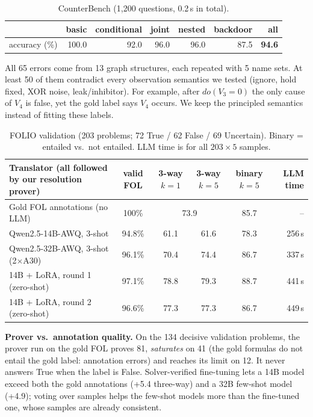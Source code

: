 \documentclass[10pt,a4paper]{article}
\newcommand{\RtwoKone}{77.3}\newcommand{\RtwoKfive}{77.3}\newcommand{\RtwoKfiveB}{86.7}
\newcommand{\RtwoValid}{96.6\%}\newcommand{\RtwoN}{2{,}703}
\begin{document}
\begin{table}[H]
\centering\small
\caption{CounterBench (1{,}200 questions, 0.2\,s in total).}
\label{tab:cb}
\begin{tabular}{@{}lrrrrrr@{}}
\toprule
 & basic & conditional & joint & nested & backdoor & \textbf{all} \\
\midrule
accuracy (\%) & 100.0 & 92.0 & 96.0 & 96.0 & 87.5 & \textbf{94.6} \\
\bottomrule
\end{tabular}
\end{table}
\noindent All 65 errors come from 13 graph structures, each repeated with 5 name sets. At least 50 of them contradict every observation semantics we tested (ignore, hold fixed, XOR noise, leak/inhibitor). For example, after $do(V_3{=}0)$ the only cause of $V_4$ is false, yet the gold label says $V_4$ occurs. We keep the principled semantics instead of fitting these labels.

\begin{table}[H]
\centering\small
\caption{FOLIO validation (203 problems; 72 True / 62 False / 69 Uncertain). Binary = entailed vs.\ not entailed. LLM time is for all $203\times5$ samples.}
\label{tab:folio}
\begin{tabular}{@{}lccccr@{}}
\toprule
Translator (all followed by our resolution prover) & valid FOL & 3-way $k{=}1$ & 3-way $k{=}5$ & binary $k{=}5$ & LLM time \\
\midrule
Gold FOL annotations (no LLM) & 100\% & \multicolumn{2}{c}{73.9} & 85.7 & -- \\
Qwen2.5-14B-AWQ, 3-shot & 94.8\% & 61.1 & 61.6 & 78.3 & 256\,s \\
Qwen2.5-32B-AWQ, 3-shot (2$\times$A30) & 96.1\% & 70.4 & 74.4 & 86.7 & 337\,s \\
14B + LoRA, round 1 (zero-shot) & 97.1\% & 78.8 & 79.3 & 88.7 & 441\,s \\
14B + LoRA, round 2 (zero-shot) & \RtwoValid & \RtwoKone & \RtwoKfive & \RtwoKfiveB & 449\,s \\
\bottomrule
\end{tabular}
\end{table}

\noindent\textbf{Prover vs.\ annotation quality.} On the 134 decisive validation problems, the prover run on the gold FOL proves 81, \emph{saturates} on 41 (the gold formulas do not entail the gold label: annotation errors) and reaches its limit on 12. It never answers True when the label is False. Solver-verified fine-tuning lets a 14B model exceed both the gold annotations (+5.4 three-way) and a 32B few-shot model (+4.9); voting over samples helps the few-shot models more than the fine-tuned one, whose samples are already consistent.
\end{document}
